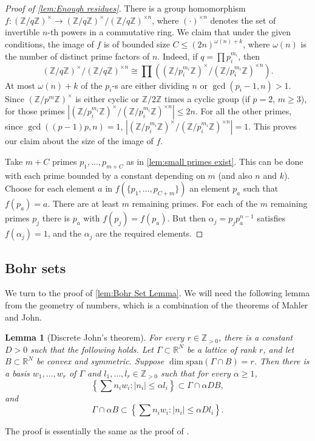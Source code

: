 \documentclass[12pt, a4paper]{amsart}
\numberwithin{equation}{section}
\newtheorem{lemma}[theorem]{Lemma}
\theoremstyle{definition}
\newcommand{\R}{\mathbb{R}}
\newcommand{\Z}{\mathbb{Z}}
\newcommand{\spann}{\mathrm{span}}
\begin{document}
\begin{proof}[Proof of \cref{lem:Enough residues}]
There is a group homomorphism $f\colon \left(\Z/q\Z\right)^{\times}\to\left(\Z/q\Z\right)^{\times}/\left(\Z/q\Z\right)^{\times n}$,
where $(\cdot)^{\times n}$ denotes the set of invertible
$n$-th powers in a commutative ring.
We claim that under the given conditions, the image of $f$ is of bounded size $C\le(2n)^{\omega(n)+k}$, where $\omega(n)$ is the number of distinct prime factors of $n$. Indeed, if $q=\prod p_{i}^{m_{i}}$,
then 
\[
\left(\Z/q\Z\right)^{\times}/\left(\Z/q\Z\right)^{\times n}\cong\prod\left(\left(\Z/p_{i}^{m_{i}}\Z\right)^{\times}/\left(\Z/p_{i}^{m_{i}}\Z\right)^{\times n}\right).
\]
At most $\omega(n)+k$ of the $p_{i}$-s are either dividing $n$ or $\gcd(p_i-1,n)>1$.
Since $(\Z/p^{m}\Z)^{\times}$ is either cyclic or $\Z/2\Z$ times
a cyclic group (if $p=2$, $m\ge3$), for those primes $|(\Z/p_{i}^{m_{i}}\Z)^{\times}/(\Z/p_{i}^{m_{i}}\Z)^{\times n}|\le2n$.
For all the other primes, since $\gcd((p-1)p,n)=1$,  $|\left(\Z/p_{i}^{m_{i}}\Z\right)^{\times}/\left(\Z/p_{i}^{m_{i}}\Z\right)^{\times n}|=1$.
This proves our claim about the size of the image of $f$. 

Take $m+C$ primes $p_{1},\ldots,p_{m+C}$ as in \cref{lem:small primes exist}. This can be done with each prime bounded by a constant depending on $m$ (and also $n$ and $k$). Choose for each element $a$ in $f(\{p_{1},\ldots,p_{C+m}\})$ an element $p_{a}$ such that $f(p_{a})=a$. There are at least $m$ remaining primes.
For each of the $m$ remaining primes $p_{j}$ there is $p_{a}$ with $f(p_{j})=f(p_{a})$.
But then $\alpha_{j}=p_{j}p_{a}^{n-1}$ satisfies $f(\alpha_{j})=1$, and the $\alpha_{j}$ are the required elements. 
\end{proof}

\subsection{Bohr sets}\label{sec:Bohr}
We turn to the proof of \cref{lem:Bohr Set Lemma}. We will need the following lemma from the geometry of numbers, which is a combination of the theorems of Mahler and John.
\begin{lemma}[Discrete John's theorem]
\label{lem:Discrete John Theorem}
For every $r\in\Z_{>0}$, there is a constant $D>0$ such that the following holds.
Let $\Gamma \subset \R^N$ be a lattice of rank $r$, and let
$B\subset\R^{N}$ be convex and symmetric. Suppose $\dim\spann(\Gamma\cap B)=r$.
Then there is a basis $w_{1},\ldots,w_{r}$ of $\Gamma$ and $l_{1},\ldots,l_{r}\in\Z_{>0}$
such that for every $\alpha\ge1$, 
\[
\left\{ \sum n_{i}w_{i}:\left|n_{i}\right|\le \alpha l_{i}\right\} \subset\Gamma\cap \alpha DB,
\]
and 
\[
\Gamma\cap\alpha B\subset\left\{ \sum n_{i}w_{i}:\left|n_{i}\right|\le \alpha Dl_{i}\right\} .
\]
\end{lemma}
The proof is essentially the same as the proof of \cite[Lemma~3.36]{tao2006additive}.
\end{document}
